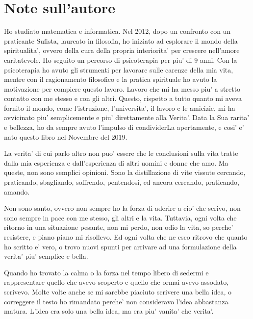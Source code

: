 
\chapter{Note sull'autore}

Ho studiato matematica e informatica. Nel 2012, dopo un confronto con un praticante Sufista, laureato in filosofia, ho iniziato ad esplorare il mondo della spiritualita', ovvero della cura della propria interiorita' per crescere nell'amore caritatevole. Ho seguito un percorso di psicoterapia per piu' di 9 anni. Con la psicoterapia ho avuto gli strumenti per lavorare sulle carenze della mia vita, mentre con il ragionamento filosofico e la pratica spirituale ho avuto la motivazione per compiere questo lavoro. Lavoro che mi ha messo piu' a stretto contatto con me stesso e con gli altri. Questo, rispetto a tutto quanto mi aveva fornito il mondo, come l'istruzione, l'universita', il lavoro e le amicizie, mi ha avvicinato piu' semplicemente e piu' direttamente alla Verita'. Data la Sua rarita' e bellezza, ho da sempre avuto l'impulso di condividerLa apertamente, e cosi' e' nato questo libro nel Novembre del 2019.

La verita' di cui parlo altro non puo' essere che le conclusioni sulla vita tratte dalla mia esperienza e dall'esperienza di altri uomini e donne che amo. Ma queste, non sono semplici opinioni. Sono la distillazione di vite vissute cercando, praticando, sbagliando, soffrendo, pentendosi, ed ancora cercando, praticando, amando.

Non sono santo, ovvero non sempre ho la forza di aderire a cio' che scrivo, non sono sempre in pace con me stesso, gli altri e la vita. Tuttavia, ogni volta che ritorno in una situazione pesante, non mi perdo, non odio la vita, so perche' resistere, e piano piano mi risollevo. Ed ogni volta che ne esco ritrovo che quanto ho scritto e' vero, o trovo nuovi spunti per arrivare ad una formulazione della verita' piu' semplice e bella. 

Quando ho trovato la calma o la forza nel tempo libero di sedermi e rappresentare quello che avevo scoperto e quello che ormai avevo assodato, scrivevo. Molte volte anche se mi sarebbe piaciuto scrivere una bella idea, o correggere il testo ho rimandato perche' non consideravo l'idea abbastanza matura. L'idea era solo una bella idea, ma era piu' vanita' che verita'. 

